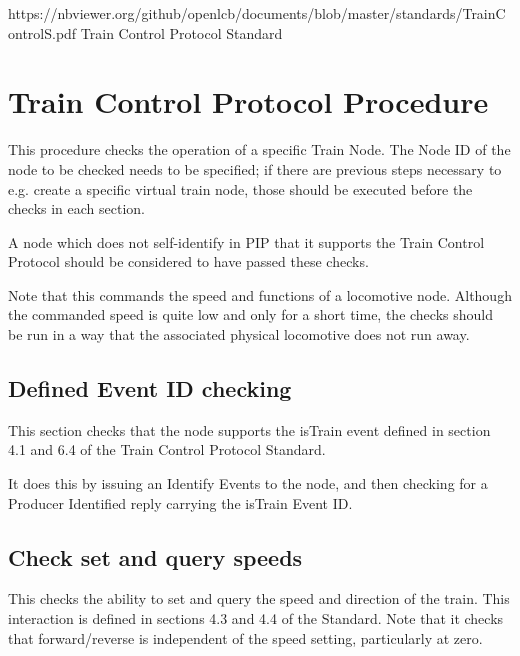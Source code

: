 



\maketitle
\thispagestyle{firststyle}

\introductionCaveats
    {https://nbviewer.org/github/openlcb/documents/blob/master/standards/TrainControlS.pdf}
    {Train Control Protocol Standard}

\section{Train Control Protocol Procedure}


This procedure checks the operation of a specific Train Node. 
The Node ID of the node to be checked needs to be specified; 
if there are previous steps necessary to e.g. create a specific 
virtual train node, those should be executed before the checks in each section.

A node which does not self-identify in PIP that it supports
the Train Control Protocol should be considered to have passed these checks.
\pipsetFootnote

Note that this commands the speed and functions of a locomotive node.
Although the commanded speed is quite low and only for a short time, the
checks should be run in a way that the associated physical locomotive
does not run away.

\subsection{Defined Event ID checking}

This section checks that the node supports the isTrain event
defined in section 4.1 and 6.4 of the Train Control Protocol Standard.

It does this by issuing an Identify Events to the node, and then
checking for a Producer Identified reply carrying the isTrain Event ID.

\subsection{Check set and query speeds}

This checks the ability to set and query the speed and direction of the train.
This interaction is defined in sections 4.3 and 4.4 of the Standard.
Note that it checks that forward/reverse is independent of the speed setting, particularly
at zero.

